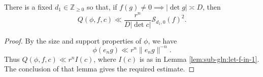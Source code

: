 \begin{lemma}\label{lem:standard:there-fixed-d_1-1}
  There is a fixed $d_1 \in \mathbb{Z}_{\geq 0}$ so that, if $f(g) \neq 0 \implies |\det g| \asymp D$, then
  \begin{equation*}
    Q(\phi,f,c) \ll \frac{r^n}{D |\det c|} \mathcal{S}_{d_1,0}(f)^2.
  \end{equation*}
\end{lemma}
\begin{proof}
  By the size and support properties of $\phi$, we have
  \begin{equation*}
    \phi(e_n g) \ll r^n \|e_n g\|^{-n}.
  \end{equation*}
  Thus $Q(\phi,f,c) \ll r^n I(c)$, where $I(c)$ is as in Lemma \ref{lem:sub-gln:let-f-in-1}.  The conclusion of that lemma gives the required estimate.
\end{proof}

